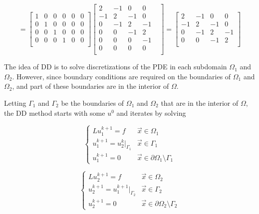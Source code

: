 \begin{equation*}
    =
\begin{bmatrix}
        1 & 0 & 0 & 0 & 0 & 0\\
        0 & 1 & 0 & 0 & 0 & 0\\
        0 & 0 & 1 & 0 & 0 & 0\\
        0 & 0 & 0 & 1 & 0 & 0\\
\end{bmatrix}
\begin{bmatrix}
    2&-1&0&0\\
    -1&2&-1&0\\
    0&-1&2&-1\\
    0&0&-1&2\\
    0&0&0&-1&\\
    0&0&0&0\\
\end{bmatrix}
=
\begin{bmatrix}
    2&-1&0&0\\
    -1&2&-1&0\\
    0&-1&2&-1\\
    0&0&-1&2\\
\end{bmatrix}
\end{equation*}

The idea of DD is to solve discretizations of the PDE in each subdomain $\Omega_1$ and $\Omega_2$. However, since boundary conditions are required on the boundaries of $\Omega_1$ and $\Omega_2$, and part of these boundaries are in the interior of $\Omega$.

\begin{center}
    
\end{center}

Letting $\Gamma_1$ and $\Gamma_2$ be the boundaries of $\Omega_1$ and $\Omega_2$ that are in the interior of $\Omega$, the DD method starts with some $u^0$ and iterates by solving

\begin{equation*}
    \begin{cases}
    Lu_1^{k+1} = f & \vec{x}\in \Omega_1\\
    u_1^{k+1} = u_2^k \bigg\rvert_{\Gamma_1} & \vec{x}\in \Gamma_1 \\
    u_1^{k+1} = 0 & \vec{x} \in \partial \Omega_1 \setminus \Gamma_1
    \end{cases}
\end{equation*}

\begin{equation*}
    \begin{cases}
    Lu_2^{k+1} = f & \vec{x}\in \Omega_2\\
    u_2^{k+1} = u_1^{k+1} \bigg\rvert_{\Gamma_2} & \vec{x}\in \Gamma_2 \\
    u_2^{k+1} = 0 & \vec{x} \in \partial \Omega_2 \setminus \Gamma_2
    \end{cases}
\end{equation*}

